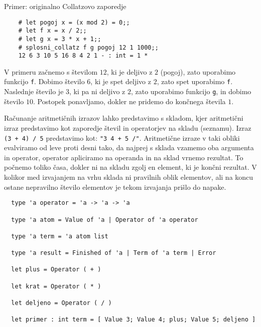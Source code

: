 \documentclass[arhiv]{../izpit}
\begin{document}
  
  Primer: originalno Collatzovo zaporedje
  \begin{verbatim}
    # let pogoj x = (x mod 2) = 0;;
    # let f x = x / 2;;
    # let g x = 3 * x + 1;;
    # splosni_collatz f g pogoj 12 1 1000;;
    12 6 3 10 5 16 8 4 2 1 - : int = 1 *
  \end{verbatim}

  V primeru začnemo s številom $12$, ki je deljivo z $2$ (pogoj), zato uporabimo funkcijo \verb|f|.
  Dobimo število $6$, ki je spet deljivo z $2$, zato spet uporabimo \verb|f|.
  Naslednje število je $3$, ki pa ni deljivo z $2$, zato uporabimo funkcijo \verb|g|, in dobimo število $10$.
  Postopek ponavljamo, dokler ne pridemo do končnega števila $1$.


\naloga

Računanje aritmetičnih izrazov lahko predstavimo s skladom, kjer aritmetični izraz predstavimo kot 
zaporedje števil in operatorjev na skladu (seznamu). 
Izraz \verb|(3 + 4) / 5| predstavimo kot: \verb|"3 4 + 5 /"|. 
Aritmetične izraze v taki obliki evalviramo od leve proti desni tako, da najprej s sklada vzamemo 
oba argumenta in operator, operator apliciramo na operanda in na sklad vrnemo rezultat. 
To počnemo toliko časa, dokler ni na skladu zgolj en element, ki je končni rezultat. 
V kolikor med izvajanjem na vrhu sklada ni pravilnih oblik elementov, ali na koncu ostane nepravilno 
število elementov je tekom izvajanja prišlo do napake.  

\begin{verbatim}
  type 'a operator = 'a -> 'a -> 'a

  type 'a atom = Value of 'a | Operator of 'a operator
  
  type 'a term = 'a atom list
  
  type 'a result = Finished of 'a | Term of 'a term | Error
  
  let plus = Operator ( + )
  
  let krat = Operator ( * )
  
  let deljeno = Operator ( / )
  
  let primer : int term = [ Value 3; Value 4; plus; Value 5; deljeno ]    
\end{verbatim}
\end{document}

